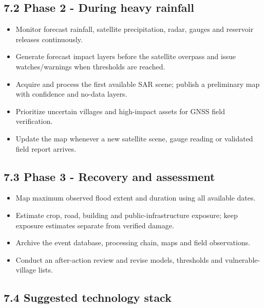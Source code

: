 \documentclass[11pt,a4paper]{article}
\begin{document}
\subsection{7.2 Phase 2 - During heavy rainfall}\label{phase-2---during-heavy-rainfall}

\begin{itemize}
\item
  Monitor forecast rainfall, satellite precipitation, radar, gauges and reservoir releases continuously.
\item
  Generate forecast impact layers before the satellite overpass and issue watches/warnings when thresholds are reached.
\item
  Acquire and process the first available SAR scene; publish a preliminary map with confidence and no-data layers.
\item
  Prioritize uncertain villages and high-impact assets for GNSS field verification.
\item
  Update the map whenever a new satellite scene, gauge reading or validated field report arrives.
\end{itemize}

\subsection{7.3 Phase 3 - Recovery and assessment}\label{phase-3---recovery-and-assessment}

\begin{itemize}
\item
  Map maximum observed flood extent and duration using all available dates.
\item
  Estimate crop, road, building and public-infrastructure exposure; keep exposure estimates separate from verified damage.
\item
  Archive the event database, processing chain, maps and field observations.
\item
  Conduct an after-action review and revise models, thresholds and vulnerable-village lists.
\end{itemize}

\subsection{7.4 Suggested technology stack}\label{suggested-technology-stack}
\end{document}
